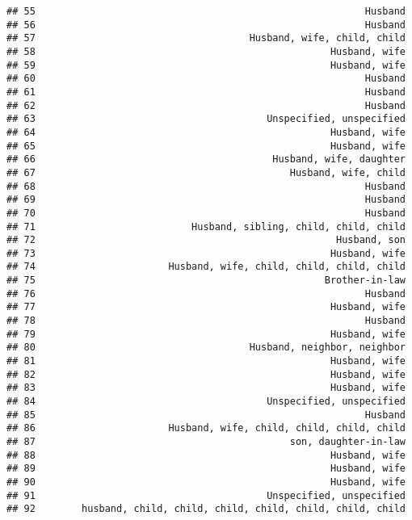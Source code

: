 \documentclass[
]{article}
\begin{document}
\begin{verbatim}
## 55                                                         Husband
## 56                                                         Husband
## 57                                     Husband, wife, child, child
## 58                                                   Husband, wife
## 59                                                   Husband, wife
## 60                                                         Husband
## 61                                                         Husband
## 62                                                         Husband
## 63                                        Unspecified, unspecified
## 64                                                   Husband, wife
## 65                                                   Husband, wife
## 66                                         Husband, wife, daughter
## 67                                            Husband, wife, child
## 68                                                         Husband
## 69                                                         Husband
## 70                                                         Husband
## 71                           Husband, sibling, child, child, child
## 72                                                    Husband, son
## 73                                                   Husband, wife
## 74                       Husband, wife, child, child, child, child
## 75                                                  Brother-in-law
## 76                                                         Husband
## 77                                                   Husband, wife
## 78                                                         Husband
## 79                                                   Husband, wife
## 80                                     Husband, neighbor, neighbor
## 81                                                   Husband, wife
## 82                                                   Husband, wife
## 83                                                   Husband, wife
## 84                                        Unspecified, unspecified
## 85                                                         Husband
## 86                       Husband, wife, child, child, child, child
## 87                                            son, daughter-in-law
## 88                                                   Husband, wife
## 89                                                   Husband, wife
## 90                                                   Husband, wife
## 91                                        Unspecified, unspecified
## 92        husband, child, child, child, child, child, child, child

\end{verbatim}
\end{document}
